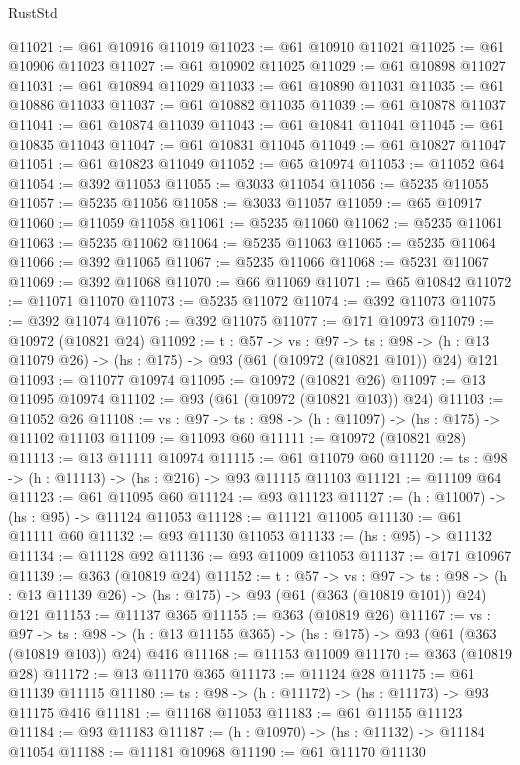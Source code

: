 \begin{lexlean}{RustStd}
\begin{coremodule}
@11021 := @61 @10916 @11019
@11023 := @61 @10910 @11021
@11025 := @61 @10906 @11023
@11027 := @61 @10902 @11025
@11029 := @61 @10898 @11027
@11031 := @61 @10894 @11029
@11033 := @61 @10890 @11031
@11035 := @61 @10886 @11033
@11037 := @61 @10882 @11035
@11039 := @61 @10878 @11037
@11041 := @61 @10874 @11039
@11043 := @61 @10841 @11041
@11045 := @61 @10835 @11043
@11047 := @61 @10831 @11045
@11049 := @61 @10827 @11047
@11051 := @61 @10823 @11049
@11052 := @65 @10974
@11053 := @11052 @64
@11054 := @392 @11053
@11055 := @3033 @11054
@11056 := @5235 @11055
@11057 := @5235 @11056
@11058 := @3033 @11057
@11059 := @65 @10917
@11060 := @11059 @11058
@11061 := @5235 @11060
@11062 := @5235 @11061
@11063 := @5235 @11062
@11064 := @5235 @11063
@11065 := @5235 @11064
@11066 := @392 @11065
@11067 := @5235 @11066
@11068 := @5231 @11067
@11069 := @392 @11068
@11070 := @66 @11069
@11071 := @65 @10842
@11072 := @11071 @11070
@11073 := @5235 @11072
@11074 := @392 @11073
@11075 := @392 @11074
@11076 := @392 @11075
@11077 := @171 @10973
@11079 := @10972 (@10821 @24)
@11092 := {t : @57} ->
  {vs : @97} ->
  {ts : @98} -> (h : @13 @11079 @26) -> (hs : @175) -> @93 (@61 (@10972 (@10821 @101)) @24) @121
@11093 := @11077 @10974
@11095 := @10972 (@10821 @26)
@11097 := @13 @11095 @10974
@11102 := @93 (@61 (@10972 (@10821 @103)) @24)
@11103 := @11052 @26
@11108 := {vs : @97} -> {ts : @98} -> (h : @11097) -> (hs : @175) -> @11102 @11103
@11109 := @11093 @60
@11111 := @10972 (@10821 @28)
@11113 := @13 @11111 @10974
@11115 := @61 @11079 @60
@11120 := {ts : @98} -> (h : @11113) -> (hs : @216) -> @93 @11115 @11103
@11121 := @11109 @64
@11123 := @61 @11095 @60
@11124 := @93 @11123
@11127 := (h : @11007) -> (hs : @95) -> @11124 @11053
@11128 := @11121 @11005
@11130 := @61 @11111 @60
@11132 := @93 @11130 @11053
@11133 := (hs : @95) -> @11132
@11134 := @11128 @92
@11136 := @93 @11009 @11053
@11137 := @171 @10967
@11139 := @363 (@10819 @24)
@11152 := {t : @57} ->
  {vs : @97} ->
  {ts : @98} -> (h : @13 @11139 @26) -> (hs : @175) -> @93 (@61 (@363 (@10819 @101)) @24) @121
@11153 := @11137 @365
@11155 := @363 (@10819 @26)
@11167 := {vs : @97} ->
  {ts : @98} -> (h : @13 @11155 @365) -> (hs : @175) -> @93 (@61 (@363 (@10819 @103)) @24) @416
@11168 := @11153 @11009
@11170 := @363 (@10819 @28)
@11172 := @13 @11170 @365
@11173 := @11124 @28
@11175 := @61 @11139 @11115
@11180 := {ts : @98} -> (h : @11172) -> (hs : @11173) -> @93 @11175 @416
@11181 := @11168 @11053
@11183 := @61 @11155 @11123
@11184 := @93 @11183
@11187 := (h : @10970) -> (hs : @11132) -> @11184 @11054
@11188 := @11181 @10968
@11190 := @61 @11170 @11130

\end{coremodule}
\end{lexlean}
